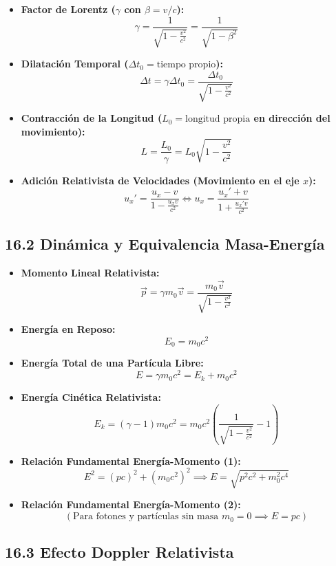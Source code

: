 \documentclass[11pt,a4paper]{article}
\begin{document}
\begin{itemize}
  \item \textbf{Factor de Lorentz ($\gamma$ con $\beta = v/c$):}
  \[
    \gamma = \frac{1}{\sqrt{1 - \frac{v^2}{c^2}}} = \frac{1}{\sqrt{1 - \beta^2}}
  \]
  \item \textbf{Dilatación Temporal ($\Delta t_0 = \text{tiempo propio}$):}
  \[
    \Delta t = \gamma \Delta t_0 = \frac{\Delta t_0}{\sqrt{1 - \frac{v^2}{c^2}}}
  \]
  \item \textbf{Contracción de la Longitud ($L_0 = \text{longitud propia}$ en dirección del movimiento):}
  \[
    L = \frac{L_0}{\gamma} = L_0 \sqrt{1 - \frac{v^2}{c^2}}
  \]
  \item \textbf{Adición Relativista de Velocidades (Movimiento en el eje $x$):}
  \[
    u_x' = \frac{u_x - v}{1 - \frac{u_x v}{c^2}} \iff u_x = \frac{u_x' + v}{1 + \frac{u_x' v}{c^2}}
  \]
\end{itemize}

\subsection*{16.2 Dinámica y Equivalencia Masa-Energía}

\begin{itemize}
  \item \textbf{Momento Lineal Relativista:}
  \[
    \vec{p} = \gamma m_0 \vec{v} = \frac{m_0 \vec{v}}{\sqrt{1 - \frac{v^2}{c^2}}}
  \]
  \item \textbf{Energía en Reposo:}
  \[
    E_0 = m_0 c^2
  \]
  \item \textbf{Energía Total de una Partícula Libre:}
  \[
    E = \gamma m_0 c^2 = E_k + m_0 c^2
  \]
  \item \textbf{Energía Cinética Relativista:}
  \[
    E_k = (\gamma - 1) m_0 c^2 = m_0 c^2 \left( \frac{1}{\sqrt{1 - \frac{v^2}{c^2}}} - 1 \right)
  \]
  \item \textbf{Relación Fundamental Energía-Momento (1):}
  \[
    E^2 = (p c)^2 + (m_0 c^2)^2 \implies E = \sqrt{p^2 c^2 + m_0^2 c^4}
  \]
  \item \textbf{Relación Fundamental Energía-Momento (2):}
  \[
    (\text{Para fotones y partículas sin masa } m_0 = 0 \implies E = p c)
  \]
\end{itemize}

\subsection*{16.3 Efecto Doppler Relativista}
\end{document}
